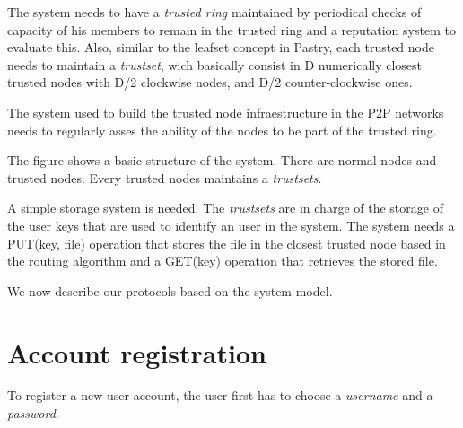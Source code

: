 The system needs to have a \textit{trusted ring} maintained by periodical
checks of capacity of his members to remain in the trusted ring and a
reputation system to evaluate this. Also, similar to the
leafset concept in Pastry, each trusted node needs to maintain a
\textit{trustset}, wich basically consist in D numerically closest trusted
nodes with D/2 clockwise nodes, and D/2 counter-clockwise ones.

The system used to build the trusted node infraestructure in the P2P networks
needs to regularly asses the ability of the nodes to be part of the trusted
ring.

The figure shows a basic structure of the system. There are normal nodes and
trusted nodes. Every trusted nodes maintains a \textit{trustsets}.

A simple storage system is needed.
The \textit{trustsets} are in charge of the storage of the user keys that are
used to identify an user in the system. The system needs a PUT(key,
file) operation that stores the file in the closest trusted node based in the
routing algorithm and a GET(key) operation that retrieves the stored file.


We now describe our protocols based on the system model. 

\section{Account registration}

To register a new user account, the user first
has to choose a \textit{username} and a \textit{password}.
% 
% 

